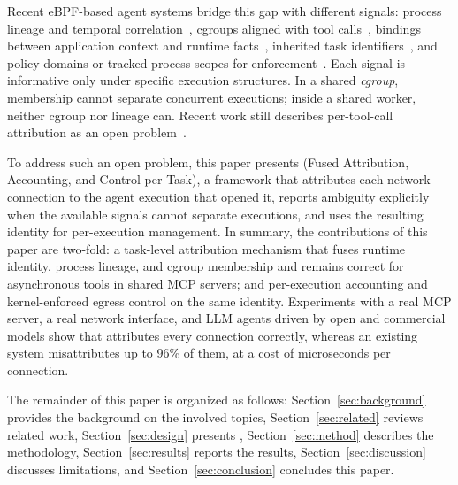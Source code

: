 Recent eBPF-based agent systems bridge this gap with different signals: process lineage and temporal correlation~\cite{zheng2025agentsight}, cgroups aligned with tool calls~\cite{zheng2026agentcgroup}, bindings between application context and runtime facts~\cite{byteyellow2026agentprovenance}, inherited task identifiers~\cite{cui2026contractwarden}, and policy domains or tracked process scopes for enforcement~\cite{zheng2026actplane,shukla2026agentguard}. Each signal is informative only under specific execution structures. In a shared \textit{cgroup}, membership cannot separate concurrent executions; inside a shared worker, neither cgroup nor lineage can. Recent work still describes per-tool-call attribution as an open problem~\cite{king2026kernelevidence}.

To address such an open problem, this paper presents \solution{} (Fused Attribution, Accounting, and Control per Task), a framework that attributes each network connection to the agent execution that opened it, reports ambiguity explicitly when the available signals cannot separate executions, and uses the resulting identity for per-execution management. In summary, the contributions of this paper are two-fold: \1 a task-level attribution mechanism that fuses runtime identity, process lineage, and cgroup membership and remains correct for asynchronous tools in shared MCP servers; and \2 per-execution accounting and kernel-enforced egress control on the same identity. Experiments with a real MCP server, a real network interface, and LLM agents driven by open and commercial models show that \solution{} attributes every connection correctly, whereas an existing system misattributes up to 96\% of them, at a cost of microseconds per connection.

The remainder of this paper is organized as follows: Section~\ref{sec:background} provides the background on the involved topics, Section~\ref{sec:related} reviews related work, Section~\ref{sec:design} presents \solution, Section~\ref{sec:method} describes the methodology, Section~\ref{sec:results} reports the results, Section~\ref{sec:discussion} discusses limitations, and Section~\ref{sec:conclusion} concludes this paper.